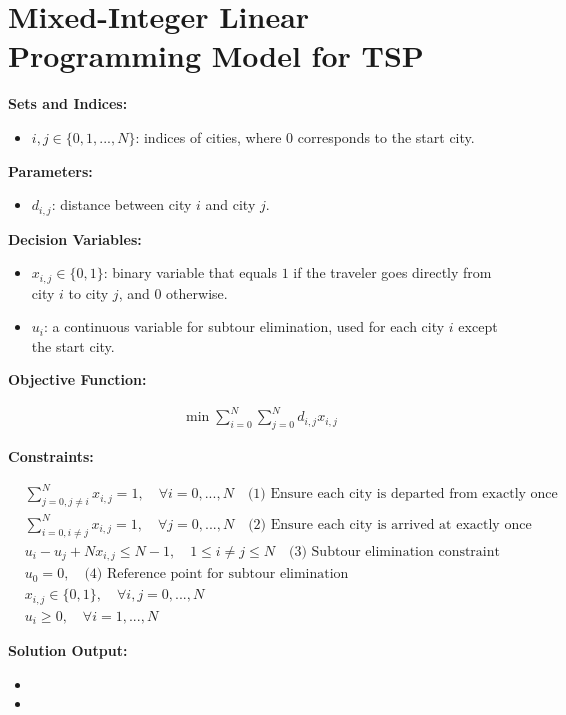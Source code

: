 \documentclass{article}
\begin{document}
\section*{Mixed-Integer Linear Programming Model for TSP}

\textbf{Sets and Indices:}
\begin{itemize}
    \item $i, j \in \{0, 1, ..., N\}$: indices of cities, where $0$ corresponds to the start city.
\end{itemize}

\textbf{Parameters:}
\begin{itemize}
    \item $d_{i,j}$: distance between city $i$ and city $j$.
\end{itemize}

\textbf{Decision Variables:}
\begin{itemize}
    \item $x_{i,j} \in \{0, 1\}$: binary variable that equals $1$ if the traveler goes directly from city $i$ to city $j$, and $0$ otherwise.
    \item $u_i$: a continuous variable for subtour elimination, used for each city $i$ except the start city.
\end{itemize}

\textbf{Objective Function:}

\begin{align}
    \min \sum_{i=0}^{N} \sum_{j=0}^{N} d_{i,j} x_{i,j}
\end{align}

\textbf{Constraints:}

\begin{align}
    & \sum_{j=0, j \neq i}^{N} x_{i,j} = 1, \quad \forall i = 0, ..., N  \quad \text{(1) Ensure each city is departed from exactly once} \\
    & \sum_{i=0, i \neq j}^{N} x_{i,j} = 1, \quad \forall j = 0, ..., N  \quad \text{(2) Ensure each city is arrived at exactly once} \\
    & u_i - u_j + N x_{i,j} \leq N - 1, \quad 1 \leq i \neq j \leq N \quad \text{(3) Subtour elimination constraint} \\
    & u_0 = 0, \quad \text{(4) Reference point for subtour elimination} \\
    & x_{i,j} \in \{0, 1\}, \quad \forall i, j = 0, ..., N \\
    & u_i \geq 0, \quad \forall i = 1, ..., N
\end{align}

\textbf{Solution Output:}
\begin{itemize}
    \item {}
    \item {}
\end{itemize}
\end{document}
